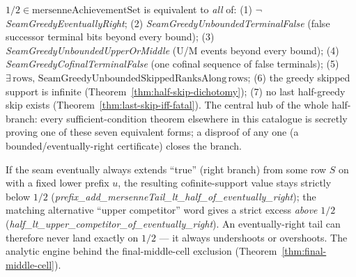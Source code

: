 \begin{thm}
\label{thm:nine-way-hub}
$1/2\in\mathrm{mersenneAchievementSet}$ is equivalent to \emph{all} of: (1)
$\neg$\emph{SeamGreedyEventuallyRight}; (2) \emph{SeamGreedyUnboundedTerminalFalse} (false
successor terminal bits beyond every bound); (3) \emph{SeamGreedyUnboundedUpperOrMiddle}
(U/M events beyond every bound); (4) \emph{SeamGreedyCofinalTerminalFalse} (one cofinal
sequence of false terminals); (5) $\exists\,\mathrm{rows},\,
\mathrm{SeamGreedyUnboundedSkippedRanksAlong}\,\mathrm{rows}$; (6) the greedy skipped
support is infinite (Theorem~\ref{thm:half-skip-dichotomy}); (7) no last half-greedy skip
exists (Theorem~\ref{thm:last-skip-iff-fatal}). The central hub of the whole half-branch:
every sufficient-condition theorem elsewhere in this catalogue is secretly proving one of
these seven equivalent forms; a disproof of any one (a bounded/eventually-right
certificate) closes the branch.
\par{}
\end{thm}

\begin{lem}
\label{lem:eventually-right-impossible}
If the seam eventually always extends ``true'' (right branch) from some row $S$ on with a
fixed lower prefix $u$, the resulting cofinite-support value stays strictly below $1/2$
(\emph{prefix\_add\_mersenneTail\_lt\_half\_of\_eventually\_right}); the matching
alternative ``upper competitor'' word gives a strict excess \emph{above} $1/2$
(\emph{half\_lt\_upper\_competitor\_of\_eventually\_right}). An eventually-right tail can
therefore never land exactly on $1/2$ — it always undershoots or overshoots. The analytic
engine behind the final-middle-cell exclusion (Theorem~\ref{thm:final-middle-cell}).
\par{}
\end{lem}

